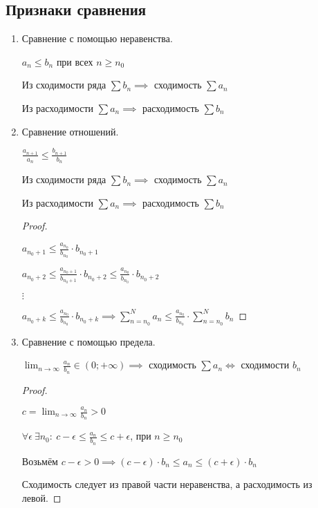 \subsection{Признаки сравнения}
	\begin{enumerate}
	\item Сравнение с помощью неравенства.
	
	$a_n \leqslant b_n$ при всех $n \geqslant n_0$
	
	Из сходимости ряда $\sum b_n \implies$ сходимость $\sum a_n$
	
	Из расходимости $\sum a_n \implies$ расходимость $\sum b_n$
	
	
	\item Сравнение отношений.
	
	$\frac{a_{n+1}}{a_n} \leqslant \frac{b_{n+1}}{b_n}$
	
	Из сходимости ряда $\sum b_n \implies$ сходимость $\sum a_n$
	
	Из расходимости $\sum a_n \implies$ расходимость $\sum b_n$
	
	\begin{proof}~
	
	$a_{n_0+1} \leqslant \frac{a_{n_0}}{b_{n_0}}\cdot b_{n_0 + 1}$
	
	$a_{n_0+2} \leqslant \frac{a_{n_0 + 1}}{b_{n_0 + 1}}\cdot b_{n_0 + 2} \leqslant \frac{a_{n_0}}{b_{n_0}}\cdot b_{n_0 + 2}$
	
	$\vdots$
	
	$a_{n_0+k} \leqslant \frac{a_{n_0}}{b_{n_0}}\cdot b_{n_0 + k} \implies \sum_{n=n_0}^{N} a_n \leqslant \frac{a_{n_0}}{b_{n_0}}\cdot \sum_{n=n_0}^{N} b_n$
	\end{proof}

	\item Сравнение с помощью предела.
	
	$\lim_{n \to \infty} \frac{a_n}{b_n} \in (0; +\infty) \implies$ сходимость $\sum a_n \iff$ сходимости $b_n$
	
	\begin{proof}~
		
	$c = \lim_{n \to \infty} \frac{a_n}{b_n} > 0$
	
	$\forall \epsilon\ \exists n_0:\ c - \epsilon \leqslant \frac{a_n}{b_n} \leqslant c + \epsilon$, при $n \geqslant n_0$
	
	Возьмём $c - \epsilon > 0 \implies (c - \epsilon)\cdot b_n \leqslant a_n \leqslant (c + \epsilon)\cdot b_n$
	
	Сходимость следует из правой части неравенства, а расходимость из левой. 
	\end{proof}
\end{enumerate}
